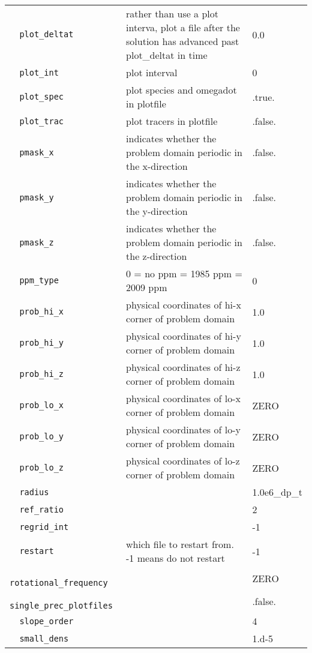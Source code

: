 {\begin{center}
\begin{longtable}{|l|p{3.25in}|l|}
\verb=  plot_deltat  = &   rather than use a plot interva, plot a file after the solution has advanced past plot\_deltat in time  &  0.0 \\
\verb=  plot_int  = &   plot interval  &  0 \\
\verb=  plot_spec  = &   plot species and omegadot in plotfile  &  .true. \\
\verb=  plot_trac  = &   plot tracers in plotfile  &  .false. \\
\verb=  pmask_x  = &   indicates whether the problem domain periodic in the x-direction  &  .false. \\
\verb=  pmask_y  = &   indicates whether the problem domain periodic in the y-direction  &  .false. \\
\verb=  pmask_z  = &   indicates whether the problem domain periodic in the z-direction  &  .false. \\
\verb=  ppm_type  = &   0 = no ppm \newline 1 = 1985 ppm \newline 2 = 2009 ppm  &  0 \\
\verb=  prob_hi_x  = &   physical coordinates of hi-x corner of problem domain  &  1.0 \\
\verb=  prob_hi_y  = &   physical coordinates of hi-y corner of problem domain  &  1.0 \\
\verb=  prob_hi_z  = &   physical coordinates of hi-z corner of problem domain  &  1.0 \\
\verb=  prob_lo_x  = &   physical coordinates of lo-x corner of problem domain  &  ZERO \\
\verb=  prob_lo_y  = &   physical coordinates of lo-y corner of problem domain  &  ZERO \\
\verb=  prob_lo_z  = &   physical coordinates of lo-z corner of problem domain  &  ZERO \\
\verb=  radius  = &    &  1.0e6\_dp\_t \\
\verb=  ref_ratio  = &    &  2 \\
\verb=  regrid_int  = &    &  -1 \\
\verb=  restart  = &   which file to restart from.  -1 means do not restart  &  -1 \\
\verb=  rotational_frequency  = &    &  ZERO \\
\verb=  single_prec_plotfiles  = &    &  .false. \\
\verb=  slope_order  = &    &  4 \\
\verb=  small_dens  = &    &  1.d-5 \\

\end{longtable}
\end{center}}
